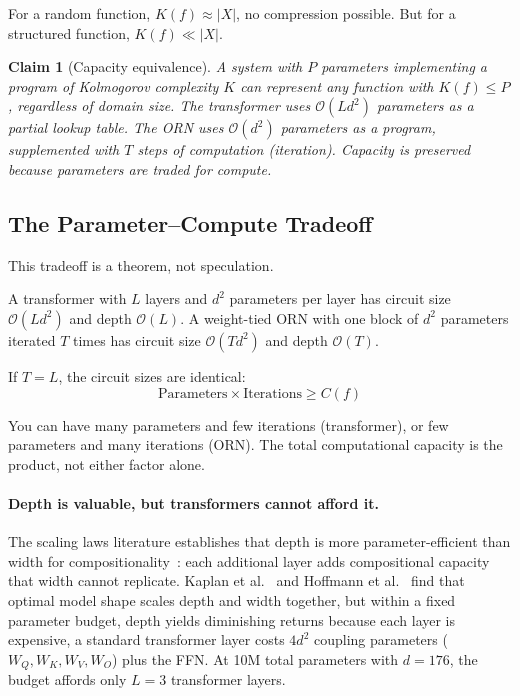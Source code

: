 \documentclass[11pt, a4paper]{article}
\newcommand{\bigO}{\mathcal{O}}
\newtheorem{claim}{Claim}
\theoremstyle{remark}
\begin{document}
For a random function, $K(f) \approx |X|$, no compression possible.
But for a structured function, $K(f) \ll |X|$.

\begin{claim}[Capacity equivalence]
A system with $P$ parameters implementing a program of Kolmogorov complexity $K$ can represent any function with $K(f) \leq P$, regardless of domain size.
The transformer uses $\bigO(Ld^2)$ parameters as a partial lookup table.
The ORN uses $\bigO(d^2)$ parameters as a program, supplemented with $T$ steps of computation (iteration).
Capacity is preserved because parameters are traded for compute.
\end{claim}

\subsection{The Parameter--Compute Tradeoff}

This tradeoff is a theorem, not speculation.

A transformer with $L$ layers and $d^2$ parameters per layer has circuit size $\bigO(Ld^2)$ and depth $\bigO(L)$.
A weight-tied ORN with one block of $d^2$ parameters iterated $T$ times has circuit size $\bigO(Td^2)$ and depth $\bigO(T)$.

If $T = L$, the circuit sizes are identical:
\begin{equation}
    \text{Parameters} \times \text{Iterations} \geq C(f)
\end{equation}

You can have many parameters and few iterations (transformer), or few parameters and many iterations (ORN).
The total computational capacity is the product, not either factor alone.

\paragraph{Depth is valuable, but transformers cannot afford it.}
The scaling laws literature establishes that depth is more parameter-efficient than width for compositionality~\cite{levine2020depth}: each additional layer adds compositional capacity that width cannot replicate.
Kaplan et al.~\cite{kaplan2020scaling} and Hoffmann et al.~\cite{hoffmann2022chinchilla} find that optimal model shape scales depth and width together, but within a fixed parameter budget, depth yields diminishing returns because each layer is expensive, a standard transformer layer costs $4d^2$ coupling parameters ($W_Q, W_K, W_V, W_O$) plus the FFN.
At 10M total parameters with $d = 176$, the budget affords only $L = 3$ transformer layers.
\end{document}
